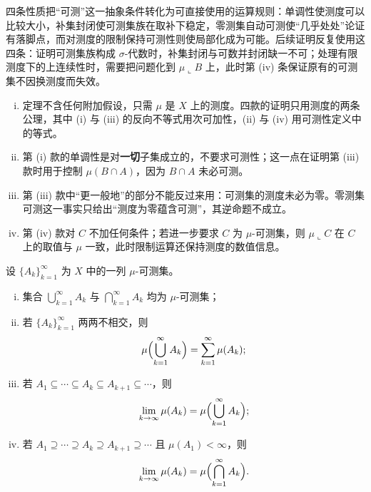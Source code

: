 \documentclass[../../main.tex]{subfiles}
\begin{document}
\begin{remark}\label{remark:ch01-thm-1-1-动机}
四条性质把“可测”这一抽象条件转化为可直接使用的运算规则：单调性使测度可以比较大小，补集封闭使可测集族在取补下稳定，零测集自动可测使“几乎处处”论证有落脚点，而对测度的限制保持可测性则使局部化成为可能。后续证明反复使用这四条：证明可测集族构成 $\sigma$-代数时，补集封闭与可数并封闭缺一不可；处理有限测度下的上连续性时，需要把问题化到 $\mu\llcorner B$ 上，此时第 (iv) 条保证原有的可测集不因换测度而失效。
\end{remark}

\begin{remark}\label{remark:ch01-thm-1-1-条件}
\begin{enumerate}[(i)]
\item 定理不含任何附加假设，只需 $\mu$ 是 $X$ 上的测度。四款的证明只用测度的两条公理，其中 (i) 与 (iii) 的反向不等式用次可加性，(ii) 与 (iv) 用可测性定义中的等式。
\item 第 (i) 款的单调性是对\textbf{一切}子集成立的，不要求可测性；这一点在证明第 (iii) 款时用于控制 $\mu(B\cap A)$，因为 $B\cap A$ 未必可测。
\item 第 (iii) 款中“更一般地”的部分不能反过来用：可测集的测度未必为零。零测集可测这一事实只给出“测度为零蕴含可测”，其逆命题不成立。
\item 第 (iv) 款对 $C$ 不加任何条件；若进一步要求 $C$ 为 $\mu$-可测集，则 $\mu\llcorner C$ 在 $C$ 上的取值与 $\mu$ 一致，此时限制运算还保持测度的数值信息。
\end{enumerate}
\end{remark}

\begin{theorem}[可测集序列]\label{theorem:ch01-1-2}
设 $\{A_{k}\}_{k=1}^{\infty}$ 为 $X$ 中的一列 $\mu$-可测集。
\begin{enumerate}[(i)]
\item 集合 $\bigcup_{k=1}^{\infty}A_{k}$ 与 $\bigcap_{k=1}^{\infty}A_{k}$ 均为 $\mu$-可测集；
\item 若 $\{A_{k}\}_{k=1}^{\infty}$ 两两不相交，则
\begin{align*}
\mu\Bigl(\bigcup_{k=1}^{\infty}A_{k}\Bigr)=\sum_{k=1}^{\infty}\mu(A_{k});
\end{align*}
\item 若 $A_{1}\subseteq\cdots\subseteq A_{k}\subseteq A_{k+1}\subseteq\cdots$，则
\begin{align*}
\lim_{k\to\infty}\mu(A_{k})=\mu\Bigl(\bigcup_{k=1}^{\infty}A_{k}\Bigr);
\end{align*}
\item 若 $A_{1}\supseteq\cdots\supseteq A_{k}\supseteq A_{k+1}\supseteq\cdots$ 且 $\mu(A_{1})<\infty$，则
\begin{align*}
\lim_{k\to\infty}\mu(A_{k})=\mu\Bigl(\bigcap_{k=1}^{\infty}A_{k}\Bigr).
\end{align*}
\end{enumerate}
\end{theorem}
\end{document}
